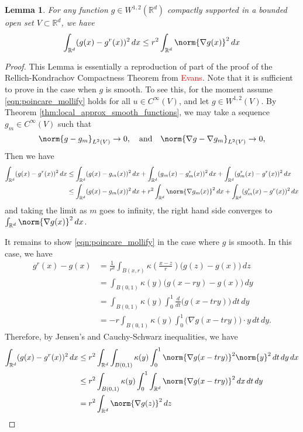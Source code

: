 \documentclass{article}
\newcommand{\Reals}{\mathbb{R}}
\newcommand{\1}{\mathbf{1}}
\newcommand{\Rd}{\Reals^d}
\theoremstyle{alden}
\theoremstyle{aldenthm}
\newtheorem{lemma}{Lemma}
\theoremstyle{definition}
\theoremstyle{remark}
\begin{document}
\begin{lemma}
	\label{lem:poincare_mollify}
	For any function $g \in W^{1,2}(\Rd)$ compactly supported in a bounded open set $V \subset \Rd$, we have
	\begin{equation}
	\label{eqn:poincare_mollify}
	\int_{\Rd} (g(x) - g^r(x))^2 \,dx \leq r^2 \int_{\Rd} \norm{\nabla g(x)}^2 \,dx
	\end{equation}
\end{lemma}
\begin{proof}
	This Lemma is essentially a reproduction of part of the proof of the Rellich-Kondrachov Compactness Theorem from \textcolor{red}{Evans}. Note that it is sufficient to prove in the case when $g$ is smooth. To see this, for the moment assume \eqref{eqn:poincare_mollify} holds for all $u \in C^{\infty}(V)$, and let $g \in W^{1,2}(V)$. By Theorem \ref{thm:local_approx_smooth_functions}, we may take a sequence $g_m \in C^{\infty}(V)$ such that
	\begin{equation*}
	\norm{g - g_m}_{L^2(V)} \to 0, \quad \textrm{and} \quad \norm{\nabla g - \nabla g_m}_{L^2(V)} \to 0,
	\end{equation*}
	Then we have
	\begin{align*}
	\int_{\Rd} (g(x) - g^r(x))^2 \,dx & \leq \int_{\Rd} (g(x) - g_m(x))^2 \,dx + \int_{\Rd}(g_m(x) - g_m^r(x))^2 \,dx + \int_{\Rd}(g_m^r(x) - g^r(x))^2 \,dx \\
	& \leq \int_{\Rd} (g(x) - g_m(x))^2 \,dx + r^2 \int_{\Rd} \norm{\nabla g_m(x)}^2 \,dx + \int_{\Rd}(g_m^r(x) - g^r(x))^2 \,dx
	\end{align*}
	and taking the limit as $m$ goes to infinity, the right hand side converges to $\int_{\Rd} \norm{\nabla g(x)}^2 \,dx$. 
	
	It remains to show \eqref{eqn:poincare_mollify} in the case where $g$ is smooth. In this case, we have
	\begin{align*}
	g^{r}(x) -  g(x) & = \frac{1}{r^d} \int_{B(x,r)} \kappa \left(\frac{x - z}{r}\right)\bigl(g(z) - g(x)\bigr) \,dz \\
	& = \int_{B(0,1)} \kappa(y) \bigl(g(x - ry) - g(x)\bigr) \,dy \\
	& = \int_{B(0,1)} \kappa(y) \int_{0}^{1} \frac{d}{dt} \bigl(g(x - try) \bigr) \,dt \,dy \\
	& = -r \int_{B(0,1)} \kappa(y) \int_{0}^{1} \bigl(\nabla g (x - try) \bigr) \cdot y \,dt \,dy.
	\end{align*} 
	Therefore, by Jensen's and Cauchy-Schwarz inequalities, we have
	\begin{align*}
	\int_{\Rd} (g(x) - g^r(x))^2 \,dx & \leq r^2 \int_{\Rd} \int_{B(0,1)} \kappa(y) \int_{0}^{1} \norm{\nabla g (x - try)}^2 \norm{y}^2 \,dt \,dy \,dx \\
	& \leq r^2 \int_{B(0,1)} \kappa(y) \int_{0}^{1} \int_{\Rd} \norm{\nabla g (x - try)}^2 \,dx \,dt \,dy \\
	& = r^2 \int_{\Rd} \norm{\nabla g(z)}^2 \,dz
	\end{align*}
\end{proof}
\end{document}
